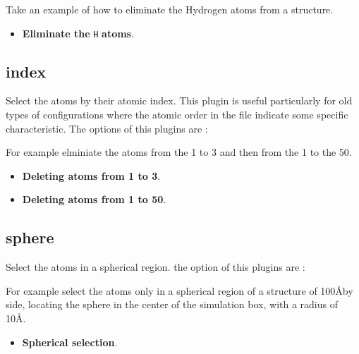 Take an example of how to eliminate the Hydrogen atoms from a structure.

\begin{itemize}
 \item \textbf{Eliminate the} \texttt{H} \textbf{atoms}.
\end{itemize}


\subsection{index}
Select the atoms by their atomic index. This plugin is useful particularly for
old types of configurations where the atomic order in the file indicate some
specific characteristic. The options of this plugins are :


For example elminiate the atoms from the 1 to 3 and then from the 1 to the 50.

\begin{itemize}
 \item \textbf{Deleting atoms from 1 to 3}.
 \item \textbf{Deleting atoms from 1 to 50}.
\end{itemize}

\subsection{sphere}
Select the atoms in a spherical region. the option of this plugins are :


For example select the atoms only in a spherical region of a structure of
100\AA by side, locating the sphere in the center of the simulation box, with a
radius of 10\AA.

\begin{itemize}
 \item \textbf{Spherical selection}.
\end{itemize}

